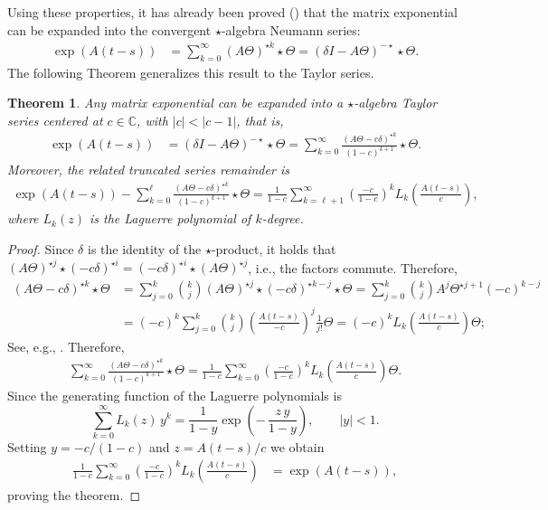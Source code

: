 \documentclass[final,1p,times,number]{elsarticle}
\theoremstyle{plain}%
\newtheorem{thm}{Theorem}[section]
\begin{document}
Using these properties, it has already been proved (\cite{giscard2015exact, GisPoz23}) that the matrix exponential can be expanded into the convergent $\star$-algebra Neumann series:
\begin{align*}
 \exp(A(t-s)) &=  \sum_{k=0}^\infty (A\Theta)^{\star k} \star \Theta = (\delta I- A\Theta)^{-\star} \star \Theta. 
\end{align*}
The following Theorem generalizes this result to the Taylor series.
\begin{thm}\label{thm:expansion}
Any matrix exponential can be expanded into a $\star$-algebra Taylor series centered at $c \in \mathbb{C}$, with $|c| < |c-1|$, that is,
\begin{align*}
 \exp(A(t-s)) &= (\delta I- A\Theta)^{-\star} \star \Theta  = \sum_{k=0}^{\infty} \frac{ \left( A \Theta - c \delta \right)^{\star k}}{(1-c)^{k+1}} \star \Theta. 
\end{align*}
Moreover, the related truncated series remainder is
\begin{align*}
 \exp(A(t-s)) - \sum_{k=0}^{\ell} \frac{ \left( A \Theta - c \delta \right)^{\star k}}{(1-c)^{k+1}} \star \Theta = \frac{1}{1-c} \sum_{k=\ell +1}^\infty \left(\frac{-c}{1-c}\right)^k L_k\left(\frac{A(t-s)}{c}\right), 
\end{align*}
where $L_k(z)$ is the Laguerre polynomial of $k$-degree. 
\end{thm}
\begin{proof}
Since $\delta$ is the identity of the $\star$-product, it holds that $(A\Theta)^{\star j} \star (-c\delta)^{\star i} = (-c\delta)^{\star i} \star (A\Theta)^{\star j}$, i.e., the factors commute. Therefore,
\begin{align*}
    \left( A \Theta - c \delta \right)^{\star k} \star \Theta &= \sum_{j=0}^k \binom{k}{j} (A\Theta)^{\star j} \star (-c\delta)^{\star k-j} \star \Theta
    = \sum_{j=0}^k \binom{k}{j} A^j \Theta^{\star j+1} (-c)^{k-j} \\
    &= (-c)^k \sum_{j=0}^k \binom{k}{j} \left(\frac{A(t-s)}{-c}\right)^j\frac{1}{j!}\Theta
    = (-c)^k L_k\left(\frac{A(t-s)}{c}\right) \Theta;
\end{align*}
See, e.g., \cite[Formula~(5.1.6)]{szego}.
Therefore, 
\begin{align*}
    \sum_{k=0}^{\infty} \frac{ \left( A \Theta - c \delta \right)^{\star k}}{(1-c)^{k+1}} \star \Theta = \frac{1}{1-c} \sum_{k=0}^\infty \left(\frac{-c}{1-c}\right)^k L_k\left(\frac{A(t-s)}{c}\right)\Theta.
\end{align*}
Since the generating function of the Laguerre polynomials \cite[Formula~(5.1.9)]{szego} is
\[
\sum_{k=0}^{\infty} L_k(z)\, y^k
= \frac{1}{1-y}\exp\!\left(-\,\frac{z\,y}{1-y}\right),
\qquad |y|<1.
\]
 Setting $y= -c/(1-c)$ and $z = A (t-s)/c$ we obtain
\begin{align}\label{eq:laguerre:series}
    \frac{1}{1-c} \sum_{k=0}^\infty \left(\frac{-c}{1-c}\right)^k L_k\left(\frac{A(t-s)}{c}\right)
    & = \exp\left(A(t-s) \right),
\end{align}
proving the theorem.
\end{proof}
\end{document}
